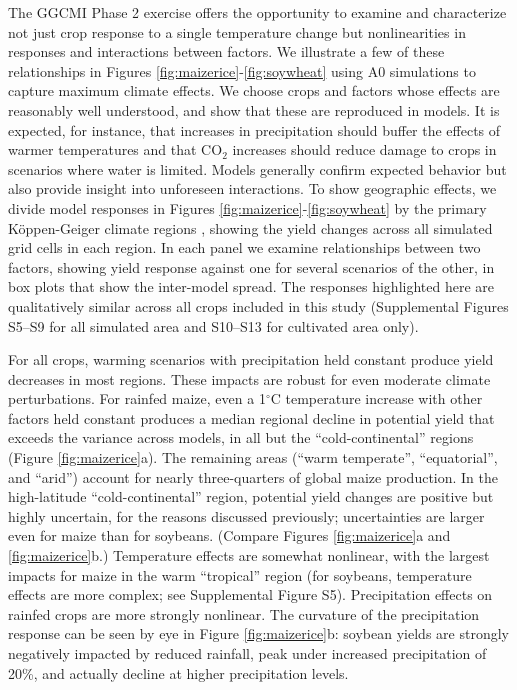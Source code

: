 \documentclass[gmd, manuscript]{copernicus} %
\begin{document}
The GGCMI Phase 2 exercise offers the opportunity to examine and characterize not just crop response to a single temperature change but nonlinearities in responses and interactions between factors. 
We illustrate a few of these relationships in Figures \ref{fig:maizerice}-\ref{fig:soywheat} using A0 simulations to capture maximum climate effects.
We choose crops and factors whose effects are reasonably well understood, and show that these are reproduced in models. 
It is expected, for instance, that increases in precipitation should buffer the effects of warmer temperatures and that CO$_2$ increases should reduce damage to crops in scenarios where water is limited. 
Models generally confirm expected behavior but also provide insight into unforeseen interactions. 
To show geographic effects, we divide model responses in Figures \ref{fig:maizerice}-\ref{fig:soywheat} by the primary K\"{o}ppen-Geiger climate regions \citep{rubel2010}, showing the yield changes across all simulated grid cells in each region. 
In each panel we examine relationships between two factors, showing yield response against one for several scenarios of the other, in box plots that show the inter-model spread. 
The responses highlighted here are qualitatively similar across all crops included in this study (Supplemental Figures S5--S9 for all simulated area and S10--S13 for cultivated area only). 

For all crops, warming scenarios with precipitation held constant produce yield decreases in most regions. 
These impacts are robust for even moderate climate perturbations. 
For rainfed maize, even a 1$^\circ$C temperature increase with other factors held constant produces a median regional decline in potential yield that exceeds the variance across models, in all but the ``cold-continental'' regions (Figure \ref{fig:maizerice}a). 
The remaining areas (``warm temperate'', ``equatorial'', and ``arid'') account for nearly three-quarters of global maize production. 
In the high-latitude ``cold-continental'' region, potential yield changes are positive but highly uncertain, for the reasons discussed previously; uncertainties are larger even for maize than for soybeans. 
(Compare Figures \ref{fig:maizerice}a and \ref{fig:maizerice}b.) 
Temperature effects are somewhat nonlinear, with the largest impacts for maize in the warm ``tropical'' region (for soybeans, temperature effects are more complex; see Supplemental Figure S5). 
Precipitation effects on rainfed crops are more strongly nonlinear. 
The curvature of the precipitation response can be seen by eye in Figure \ref{fig:maizerice}b: soybean yields are strongly negatively impacted by reduced rainfall, peak under increased precipitation of 20\%, and actually decline at higher precipitation levels. 
\end{document}
